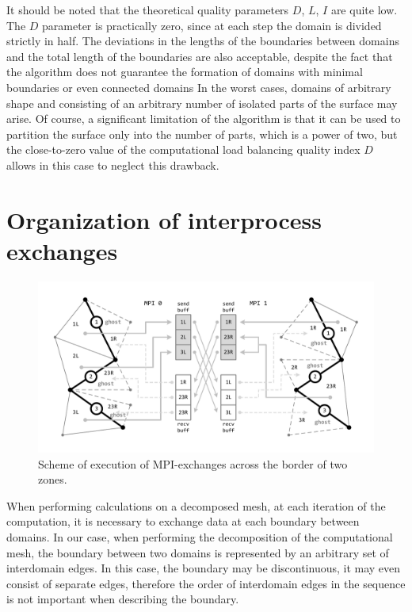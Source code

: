 \documentclass[
11pt,%
tightenlines,%
twoside,%
onecolumn,%
nofloats,%
nobibnotes,%
nofootinbib,%
superscriptaddress,%
noshowpacs,%
centertags]%
{revtex4}
\begin{document}
It should be noted that the theoretical quality parameters $ D $, $ L $, $ I $ are quite low.
The $ D $ parameter is practically zero, since at each step the domain is divided strictly in half.
The deviations in the lengths of the boundaries between domains and the total length of the boundaries are also acceptable, despite the fact that the algorithm does not guarantee the formation of domains with minimal boundaries or even connected domains
In the worst cases, domains of arbitrary shape and consisting of an arbitrary number of isolated parts of the surface may arise.
Of course, a significant limitation of the algorithm is that it can be used to partition the surface only into the number of parts, which is a power of two, but the close-to-zero value of the computational load balancing quality index $ D $ allows in this case to neglect this drawback.

\section{Organization of interprocess exchanges}

\begin{figure}[h]
\includegraphics[width=1.0\textwidth]{pics/04-MPI.pdf}
\caption{Scheme of execution of MPI-exchanges across the border of two zones.}\label{fig:04-MPI}
\end{figure}

When performing calculations on a decomposed mesh, at each iteration of the computation, it is necessary to exchange data at each boundary between domains.
In our case, when performing the decomposition of the computational mesh, the boundary between two domains is represented by an arbitrary set of interdomain edges.
In this case, the boundary may be discontinuous, it may even consist of separate edges, therefore the order of interdomain edges in the sequence is not important when describing the boundary.
\end{document}
